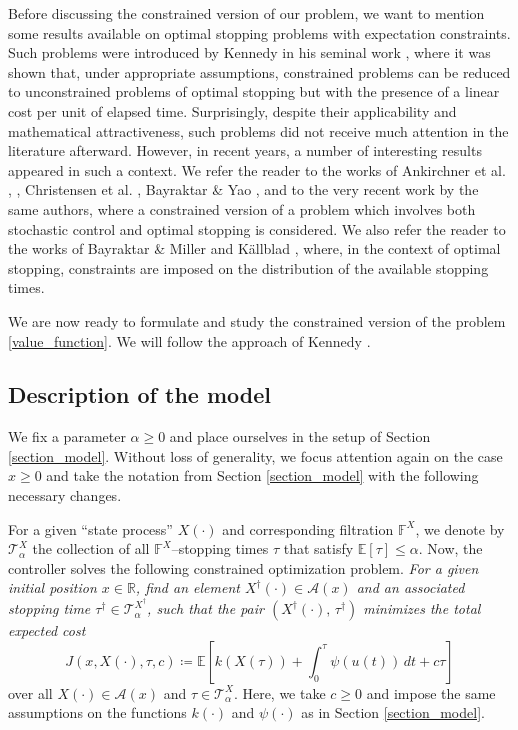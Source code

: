 \documentclass[11pt,tbtags,reqno]{article}
\theoremstyle{definition}
\numberwithin{equation}{section}
\theoremstyle{definition}
\newcommand{\ex}{\mathbb{E}}
\begin{document}
Before discussing the constrained version of our problem, we want to mention some results available on optimal stopping problems with expectation constraints. Such problems were introduced by Kennedy in his seminal work \cite{Kennedy82}, where it was shown that, under appropriate assumptions, constrained problems can be reduced to unconstrained problems of optimal stopping but with the presence of a linear cost per unit of elapsed time. Surprisingly, despite their applicability and mathematical attractiveness, such problems did not receive much attention in the literature afterward. However, in recent years, a number of interesting results appeared in such a context. We refer the reader to the works of Ankirchner et al. \cite{AnkKazTanKleKru19}, \cite{AnkKleKru19}, Christensen et al. \cite{ChrKleSch23}, Bayraktar \& Yao \cite{BayYao20}, and to the very recent work \cite{BayYao23} by the same authors, where a constrained version of a problem which involves both stochastic control and optimal stopping is considered. We also refer the reader to the works of Bayraktar \& Miller \cite{BayMil19} and Källblad \cite{kallblad22}, where, in the context of optimal stopping, constraints are imposed on the distribution of the available stopping times.

We are now ready to formulate and study the constrained version of the problem \eqref{value_function}. We will follow the approach of Kennedy \cite{Kennedy82}.

\subsection{Description of the model}

We fix a parameter $\alpha \ge 0$ and place ourselves in the setup of Section \ref{section_model}. Without loss of generality, we focus attention again on the case $x \ge 0$ and take the notation from Section \ref{section_model} with the following necessary changes.

For a given ``state process'' $X(\cdot)$ and corresponding filtration $\mathbb{F}^X$, we denote by $\mathcal{T}^X_\alpha$ the collection of all $\mathbb{F}^X$--stopping times $\tau$ that satisfy $\ex[\tau] \le \alpha$. Now, the controller solves the following constrained optimization problem. \textit{For a given initial position $x \in \mathbb{R}$, find an element $X^\dag(\cdot) \in \mathcal{A}(x)$ and an associated  stopping time $\tau^\dag \in \mathcal{T}^{X^\dag}_\alpha$, such that the pair $(X^\dag(\cdot), \, \tau^\dag)$ minimizes the total expected cost}
\begin{equation}\label{total_cost_constrained}
    J(x, X(\cdot), \tau, c) \coloneqq \mathbb{E}\left[k(X(\tau))+\int_{0}^{\tau} \psi(u(t)) \, dt + c \tau\right]
\end{equation}
over all $X(\cdot) \in \mathcal{A}(x)$ and $\tau \in \mathcal{T}^X_\alpha$. 
Here, we take $c \ge 0$ and impose the same assumptions on the functions $k(\cdot)$ and $\psi(\cdot)$ as in Section \ref{section_model}.
\end{document}
